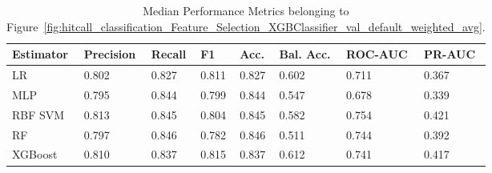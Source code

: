 \begin{longtable}{llllllll}
\caption{Median Performance Metrics belonging to Figure~\ref{fig:hitcall_classification_Feature_Selection_XGBClassifier_val_default_weighted_avg}.}\label{tab:table:hitcall_classification_feature_selection_xgbclassifier_val_default_weighted_avg}\\
\toprule
\midrule
\small Estimator & \small Precision & \small Recall & \small F1 & \small Acc. & \small Bal. Acc. & \small ROC-AUC & \small PR-AUC\\
\hline
LR & 0.802 & 0.827 & 0.811 & 0.827 & 0.602 & 0.711 & 0.367\\
MLP & 0.795 & 0.844 & 0.799 & 0.844 & 0.547 & 0.678 & 0.339\\
RBF SVM & 0.813 & 0.845 & 0.804 & 0.845 & 0.582 & 0.754 & 0.421\\
RF & 0.797 & 0.846 & 0.782 & 0.846 & 0.511 & 0.744 & 0.392\\
XGBoost & 0.810 & 0.837 & 0.815 & 0.837 & 0.612 & 0.741 & 0.417\\
\bottomrule
\end{longtable}